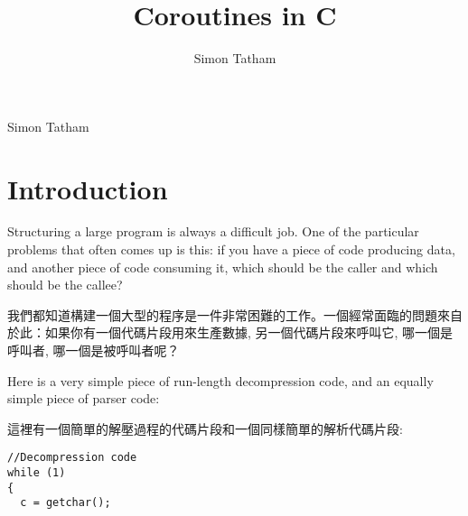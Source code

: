 \documentclass[12pt]{article}
\title{Coroutines in C}
\author{Simon Tatham}
\begin{document}
\maketitle

%

\newpage
\tableofcontents
\newpage

\begin{CJK}{UTF8}{bsmi} %
\begin{comment}
.oO Phrack 49 Oo.

Volume Seven, Issue Forty Nine File 14 of 16

BugTraq, r00t, and Underground.Org

 bring you

\end{comment}

\begin{center}
Simon Tatham

\end{center}
\section{Introduction}

 Structuring a large program is always a difficult job. One of the particular problems that often comes up is this: if you have a piece of code producing data, and another piece of code consuming it, which should be the caller and which should be the callee?

我們都知道構建一個大型的程序是一件非常困難的工作。一個經常面臨的問題來自於此：如果你有一個代碼片段用來生產數據, 另一個代碼片段來呼叫它, 哪一個是呼叫者, 哪一個是被呼叫者呢？

 Here is a very simple piece of run-length decompression code, and an equally simple piece of parser code: 


這裡有一個簡單的解壓過程的代碼片段和一個同樣簡單的解析代碼片段: 

\newpage
\begin{multicols}{2}

\begin{lstlisting}[caption=decompression, basicstyle=\footnotesize, breaklines=true, frame=single,frameround=tttt]
//Decompression code
while (1) 
{
  c = getchar();


\end{lstlisting}
\end{multicols}
\end{CJK}
\end{document}
